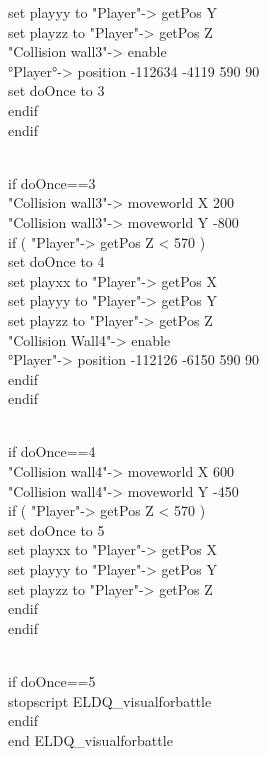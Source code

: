 set playyy to "Player"-> getPos Y\\
set playzz to "Player"-> getPos Z\\
"Collision wall3"-> enable\\
°Player°-> position -112634 -4119 590 90\\
set doOnce to 3\\
endif\\
endif\\
\strut \\
if doOnce==3\\
"Collision wall3"-> moveworld X 200\\
"Collision wall3"-> moveworld Y -800\\
if ( "Player"-> getPos Z < 570 )\\
set doOnce to 4\\
set playxx to "Player"-> getPos X\\
set playyy to "Player"-> getPos Y\\
set playzz to "Player"-> getPos Z\\
"Collision Wall4"-> enable\\
°Player"-> position -112126 -6150 590 90\\
endif\\
endif\\
\strut \\
if doOnce==4\\
"Collision wall4"-> moveworld X 600\\
"Collision wall4"-> moveworld Y -450\\
if ( "Player"-> getPos Z < 570 )\\
set doOnce to 5\\
set playxx to "Player"-> getPos X\\
set playyy to "Player"-> getPos Y\\
set playzz to "Player"-> getPos Z\\
endif\\
endif\\
\strut \\
if doOnce==5\\
stopscript ELDQ\_visualforbattle\\
endif\\
end ELDQ\_visualforbattle
